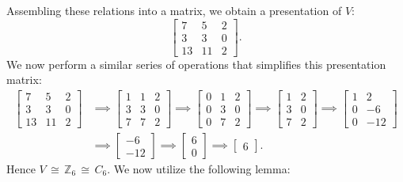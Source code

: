 \documentclass[11pt]{article}
\begin{document}
Assembling these relations into a matrix, we obtain a presentation of $V$:
\[
  \begin{bmatrix} 7 & 5 & 2 \\ 3 & 3 & 0 \\ 13 & 11 & 2 \end{bmatrix}.
\]
We now perform a similar series of operations that simplifies this presentation matrix:
\begin{align*}
  \begin{bmatrix} 7 & 5 & 2 \\ 3 & 3 & 0 \\ 13 & 11 & 2 \end{bmatrix} & \implies \begin{bmatrix} 1 & 1 & 2 \\ 3 & 3 & 0 \\ 7 & 7 & 2 \end{bmatrix} \implies \begin{bmatrix} 0 & 1 & 2 \\ 0 & 3 & 0 \\ 0 & 7 & 2 \end{bmatrix} \implies \begin{bmatrix} 1 & 2 \\ 3 & 0 \\ 7 & 2 \end{bmatrix} \implies \begin{bmatrix} 1 & 2 \\ 0 & -6 \\ 0 & -12 \end{bmatrix} \\
                    & \implies \begin{bmatrix} -6 \\ -12 \end{bmatrix} \implies \begin{bmatrix} 6 \\ 0 \end{bmatrix} \implies \begin{bmatrix} 6 \end{bmatrix}.
\end{align*}
Hence $V \, \cong \, \mathbb{Z}_{6} \, \cong \, C_{6}$. We now utilize the following lemma:
\end{document}
